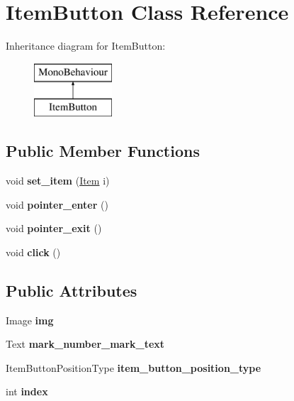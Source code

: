 \hypertarget{class_item_button}{}\section{Item\+Button Class Reference}
\label{class_item_button}
Inheritance diagram for Item\+Button\+:\begin{figure}[H]
\begin{center}
\leavevmode
\includegraphics[height=2.000000cm]{class_item_button}
\end{center}
\end{figure}
\subsection*{Public Member Functions}
\begin{DoxyCompactItemize}
\item 
\mbox{\label{class_item_button_a5e9b628234f4463b5854f8adcdf1bdcb}} 
void {\bfseries set\+\_\+item} (\hyperlink{class_item}{Item} i)
\item 
\mbox{\label{class_item_button_a89814be3c1f66f34e4d6b4e7af48d263}} 
void {\bfseries pointer\+\_\+enter} ()
\item 
\mbox{\label{class_item_button_ab38e5b4a0f9d9b0743e58429db01cb97}} 
void {\bfseries pointer\+\_\+exit} ()
\item 
\mbox{\label{class_item_button_a5d315e5efe5b0f2b1b3ec181bf82f7e4}} 
void {\bfseries click} ()
\end{DoxyCompactItemize}
\subsection*{Public Attributes}
\begin{DoxyCompactItemize}
\item 
\mbox{\label{class_item_button_a49a5ffc8c45871a54aa837fa1dc8b3d8}} 
Image {\bfseries img}
\item 
\mbox{\label{class_item_button_acfb295fe41cd3b9d3d0d2460984de659}} 
Text {\bfseries mark\+\_\+number\+\_\+mark\+\_\+text}
\item 
\mbox{\label{class_item_button_aa77b4eca5b6fa0254f96548ffa3a805b}} 
Item\+Button\+Position\+Type {\bfseries item\+\_\+button\+\_\+position\+\_\+type}
\item 
\mbox{\label{class_item_button_a0a34ac92163feffc76d602b481f5ef7d}} 
int {\bfseries index}
\end{DoxyCompactItemize}

